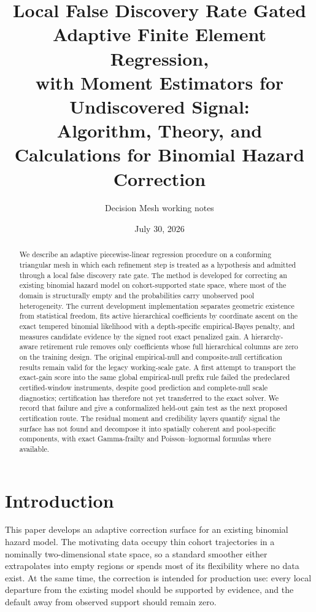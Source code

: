 \documentclass[11pt]{article}
\title{Local False Discovery Rate Gated Adaptive Finite Element Regression,\\
with Moment Estimators for Undiscovered Signal:\\
\large Algorithm, Theory, and Calculations for Binomial Hazard Correction}
\author{Decision Mesh working notes}
\date{July 30, 2026}
\begin{document}
\maketitle

\begin{abstract}
We describe an adaptive piecewise-linear regression procedure on a conforming triangular
mesh in which each refinement step is treated as a hypothesis and admitted through a
local false discovery rate gate. The method is developed for correcting an existing
binomial hazard model on cohort-supported state space, where most of the domain is
structurally empty and the probabilities carry unobserved pool heterogeneity. The current
development implementation separates geometric existence from statistical freedom, fits
active hierarchical coefficients by coordinate ascent on the exact tempered binomial
likelihood with a depth-specific empirical-Bayes penalty, and measures candidate evidence
by the signed root exact penalized gain. A hierarchy-aware retirement rule removes only
coefficients whose full hierarchical columns are zero on the training design. The
original empirical-null and composite-null certification results remain valid for the
legacy working-scale gate. A first attempt to transport the exact-gain score into the
same global empirical-null prefix rule failed the predeclared certified-window
instruments, despite good prediction and complete-null scale diagnostics; certification
has therefore not yet transferred to the exact solver. We record that failure and give a
conformalized held-out gain test as the next proposed certification route. The residual
moment and credibility layers quantify signal the surface has not found and decompose it
into spatially coherent and pool-specific components, with exact Gamma-frailty and
Poisson--lognormal formulas where available.
\end{abstract}

\tableofcontents

\section{Introduction}\label{sec:intro}

This paper develops an adaptive correction surface for an existing binomial hazard model. The
motivating data occupy thin cohort trajectories in a nominally two-dimensional state space, so a
standard smoother either extrapolates into empty regions or spends most of its flexibility where no
data exist. At the same time, the correction is intended for production use: every local departure
from the existing model should be supported by evidence, and the default away from observed support
should remain zero.
\end{document}
